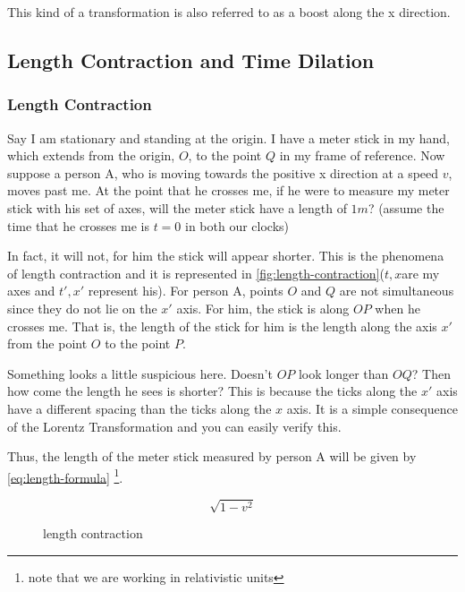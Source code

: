 \documentclass[16pt]{scrartcl}
\numberwithin{equation}{section}
\theoremstyle{plain}
\theoremstyle{definition}
\begin{document}
This kind of a transformation is also referred to as a boost along the x direction.

\subsection{Length Contraction and Time Dilation}

\subsubsection*{Length Contraction}
\hspace{\fill}
Say I am stationary and standing at the origin. I have a meter stick in my hand, which extends from the origin, $O$, to the point $Q$ in my frame of reference. Now suppose a person A, who is moving towards the positive x direction at a speed $v$, moves past me. At the point that he crosses me, if he were to measure my meter stick with his set of axes, will the meter stick have a length of $1m$? (assume the time that he crosses me is $t=0$ in both our clocks)

In fact, it will not, for him the stick will appear shorter. This is the phenomena of length contraction and it is represented in \autoref{fig:length-contraction}($t,x$are my axes and $t',x'$ represent his). For person A, points $O$ and $Q$ are not simultaneous since they do not lie on the $x'$ axis. For him, the stick is along $OP$ when he crosses me. That is, the length of the stick for him is the length along the axis $x'$ from the point $O$ to the point $P$. 

Something looks a little suspicious here. Doesn't $OP$ look longer than $OQ$? Then how come the length he sees is shorter? This is because the ticks along the $x'$ axis have a different spacing than the ticks along the $x$ axis. It is a simple consequence of the Lorentz Transformation and you can easily verify this. 

Thus, the length of the meter stick measured by person A will be given by \autoref{eq:length-formula} \footnote{note that we are working in relativistic units}.

\begin{equation}
    \sqrt{1-v^2}
    \label{eq:length-formula}
\end{equation}


\hspace{\fill}
\begin{figure}
    \centering
    \caption{length contraction}
    \label{fig:length-contraction}
\end{figure}
\end{document}
